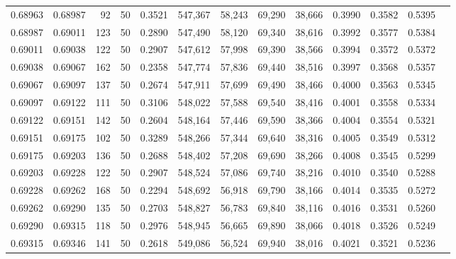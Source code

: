 \begin{tabular}{rrrrrrrrrrrrr}
0.68963 & 0.68987 &    92 &  50 &                                     0.3521 & 547,367 &  58,243 &  69,290 &  38,666 & 0.3990 & 0.3582 & 0.5395 \\
0.68987 & 0.69011 &   123 &  50 &                                     0.2890 & 547,490 &  58,120 &  69,340 &  38,616 & 0.3992 & 0.3577 & 0.5384 \\
0.69011 & 0.69038 &   122 &  50 &                                     0.2907 & 547,612 &  57,998 &  69,390 &  38,566 & 0.3994 & 0.3572 & 0.5372 \\
0.69038 & 0.69067 &   162 &  50 &                                     0.2358 & 547,774 &  57,836 &  69,440 &  38,516 & 0.3997 & 0.3568 & 0.5357 \\
0.69067 & 0.69097 &   137 &  50 &                                     0.2674 & 547,911 &  57,699 &  69,490 &  38,466 & 0.4000 & 0.3563 & 0.5345 \\
0.69097 & 0.69122 &   111 &  50 &                                     0.3106 & 548,022 &  57,588 &  69,540 &  38,416 & 0.4001 & 0.3558 & 0.5334 \\
0.69122 & 0.69151 &   142 &  50 &                                     0.2604 & 548,164 &  57,446 &  69,590 &  38,366 & 0.4004 & 0.3554 & 0.5321 \\
0.69151 & 0.69175 &   102 &  50 &                                     0.3289 & 548,266 &  57,344 &  69,640 &  38,316 & 0.4005 & 0.3549 & 0.5312 \\
0.69175 & 0.69203 &   136 &  50 &                                     0.2688 & 548,402 &  57,208 &  69,690 &  38,266 & 0.4008 & 0.3545 & 0.5299 \\
0.69203 & 0.69228 &   122 &  50 &                                     0.2907 & 548,524 &  57,086 &  69,740 &  38,216 & 0.4010 & 0.3540 & 0.5288 \\
0.69228 & 0.69262 &   168 &  50 &                                     0.2294 & 548,692 &  56,918 &  69,790 &  38,166 & 0.4014 & 0.3535 & 0.5272 \\
0.69262 & 0.69290 &   135 &  50 &                                     0.2703 & 548,827 &  56,783 &  69,840 &  38,116 & 0.4016 & 0.3531 & 0.5260 \\
0.69290 & 0.69315 &   118 &  50 &                                     0.2976 & 548,945 &  56,665 &  69,890 &  38,066 & 0.4018 & 0.3526 & 0.5249 \\
0.69315 & 0.69346 &   141 &  50 &                                     0.2618 & 549,086 &  56,524 &  69,940 &  38,016 & 0.4021 & 0.3521 & 0.5236 \\

\end{tabular}
